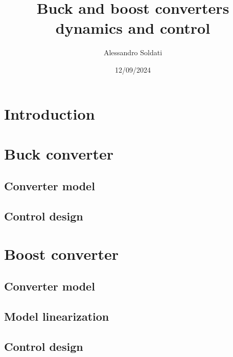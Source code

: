 \documentclass{article}
\title{Buck and boost converters dynamics and control}
\author{Alessandro Soldati}
\date{12/09/2024}
\begin{document}
\maketitle
\tableofcontents

\section{Introduction}

\section{Buck converter}
\subsection{Converter model}
\subsection{Control design}

\section{Boost converter}
\subsection{Converter model}
\subsection{Model linearization}
\subsection{Control design}
\end{document}
